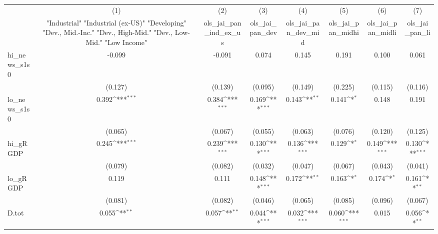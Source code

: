 {
\def\sym#1{\ifmmode^{#1}\else\(^{#1}\)\fi}
\begin{tabular}{l*{7}{c}}
\toprule
            &\multicolumn{1}{c}{(1)}&\multicolumn{1}{c}{(2)}&\multicolumn{1}{c}{(3)}&\multicolumn{1}{c}{(4)}&\multicolumn{1}{c}{(5)}&\multicolumn{1}{c}{(6)}&\multicolumn{1}{c}{(7)}\\
            &\multicolumn{1}{c}{ "Industrial" "Industrial (ex-US)" "Developing" "Dev., Mid.-Inc." "Dev., High-Mid."  "Dev., Low-Mid." "Low Income" }&\multicolumn{1}{c}{ols\_jai\_pan\_ind\_ex\_us}&\multicolumn{1}{c}{ols\_jai\_pan\_dev}&\multicolumn{1}{c}{ols\_jai\_pan\_dev\_mid}&\multicolumn{1}{c}{ols\_jai\_pan\_midhi}&\multicolumn{1}{c}{ols\_jai\_pan\_midli}&\multicolumn{1}{c}{ols\_jai\_pan\_li}\\
\midrule
hi\_news\_s1s0&      -0.099         &      -0.091         &       0.074         &       0.145         &       0.191         &       0.100         &       0.061         \\
            &     (0.127)         &     (0.139)         &     (0.095)         &     (0.149)         &     (0.225)         &     (0.115)         &     (0.116)         \\
\addlinespace
lo\_news\_s1s0&       0.392\sym{***}&       0.384\sym{***}&       0.169\sym{***}&       0.143\sym{**} &       0.141\sym{*}  &       0.148         &       0.191         \\
            &     (0.065)         &     (0.067)         &     (0.055)         &     (0.063)         &     (0.076)         &     (0.120)         &     (0.125)         \\
\addlinespace
hi\_gRGDP    &       0.245\sym{***}&       0.239\sym{***}&       0.130\sym{***}&       0.136\sym{***}&       0.129\sym{*}  &       0.149\sym{***}&       0.130\sym{***}\\
            &     (0.079)         &     (0.082)         &     (0.032)         &     (0.047)         &     (0.067)         &     (0.043)         &     (0.041)         \\
\addlinespace
lo\_gRGDP    &       0.119         &       0.111         &       0.148\sym{***}&       0.172\sym{**} &       0.163\sym{*}  &       0.174\sym{*}  &       0.161\sym{**} \\
            &     (0.081)         &     (0.082)         &     (0.046)         &     (0.065)         &     (0.085)         &     (0.096)         &     (0.067)         \\
\addlinespace
D.tot       &       0.055\sym{**} &       0.057\sym{**} &       0.044\sym{***}&       0.032\sym{***}&       0.060\sym{***}&       0.015         &       0.056\sym{**} \\

\end{tabular}}
